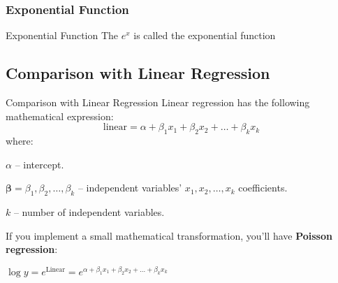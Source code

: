 \subsubsection{Exponential Function}
\begin{frame}{Exponential Function}
	The $e^x$ is called the exponential function
\end{frame}

\subsection{Comparison with Linear Regression}
\begin{frame}{Comparison with Linear Regression}
	Linear regression has the following mathematical expression:
	\small
	$$
		\text{linear} = \alpha + \beta_1 x_1 + \beta_2 x_2 + \ldots + \beta_k x_k
	$$
	where:
	\begin{vfilleditems}
		\item \small $\alpha$ -- intercept.
		\item \small $\boldsymbol{\beta} = \beta_1, \beta_2, \dots, \beta_k$ -- independent variables' $x_1, x_2, \dots, x_k$ coefficients.
		\item \small $k$ -- number of independent variables.
	\end{vfilleditems}
	If you implement a small mathematical transformation,
	you'll have \textbf{Poisson regression}:
	\begin{vfilleditems}
		\item \small $\log{y} = e^{\text{Linear}} = e^{\alpha + \beta_1 x_1 + \beta_2 x_2 + \ldots + \beta_k x_k}$
	\end{vfilleditems}
\end{frame}


